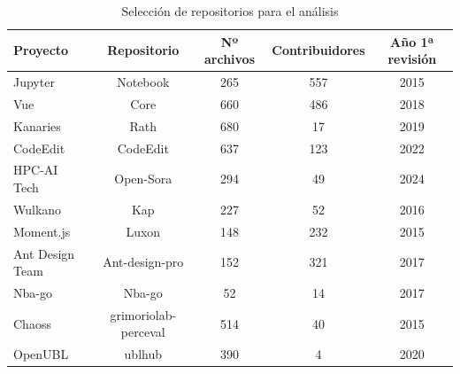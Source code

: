 \documentclass[a4paper, 12pt]{book}
\begin{document}
\begin{table}
 \begin{center}
  \begin{tabular}{ | l | c | c | c | c |} %
    \hline
    \textbf{Proyecto}          & \textbf{Repositorio}           & \textbf{Nº archivos}           & \textbf{Contribuidores}  & \textbf{Año 1ª revisión}             \\ \hline %
    Jupyter                    & Notebook                       & 265                            & 557                      & 2015                                 \\ \hline
    Vue                        & Core                           & 660                            & 486                      & 2018                                 \\ \hline
    Kanaries                   & Rath                           & 680                            & 17                       & 2019                                 \\ \hline
    CodeEdit                   & CodeEdit                       & 637                            & 123                      & 2022                                 \\ \hline
    HPC-AI Tech                & Open-Sora                      & 294                            & 49                       & 2024                                 \\ \hline
    Wulkano                    & Kap                            & 227                            & 52                       & 2016                                 \\ \hline
    Moment.js                  & Luxon                          & 148                            & 232                      & 2015                                 \\ \hline
    Ant Design Team            & Ant-design-pro                 & 152                            & 321                      & 2017                                 \\ \hline
    Nba-go                     & Nba-go                         & 52                             & 14                       & 2017                                 \\ \hline
    Chaoss                     & grimoriolab-perceval           & 514                            & 40                       & 2015                                 \\ \hline
    OpenUBL                    & ublhub                         & 390                            & 4                        & 2020                                 \\ 
    \hline
  \end{tabular}
  \caption{Selección de repositorios para el análisis}
  \label{tab:repositorios}
 \end{center}
\end{table}
\end{document}
